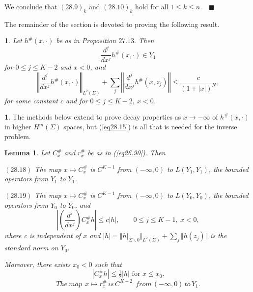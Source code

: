\documentclass{surv-l}
\theoremstyle{plain}
\newtheorem{lem}[theorem]{\sc Lemma}
\newtheorem{prop}[theorem]{\sc{Proposition}}
\theoremstyle{definition}
\newtheorem{remark}[theorem]{\sc{Remark}}
\numberwithin{equation}{chapter}
\begin{document}
We conclude that $(28.9)_{k}$ and $(28.10)_{k}$ hold for all $1\leq k\leq n.\quad \blacksquare$

The remainder of the section is devoted to proving the following result.
\setcounter{theorem}{12}
\begin{prop}\label{prop28.13} Let $h^{\#}(x, \cdot)$ be as in Proposition $27.13.$ Then
\setcounter{equation}{13}
\begin{equation}\label{eq28.14}
\frac{d^{j}}{dx^{j}}h^{\#}(x, \cdot)\in Y_{1}
\end{equation}
for $0\leq j\leq K-2$ and $x<0$, and
\begin{equation}\label{eq28.15}
\left\Vert\frac{d^{j}}{dx^{j}}h^{\#}(x, \cdot)\right\Vert_{L^{2}(\Sigma)}+\sum_{j}\left\Vert\frac{d^{j}}{d{x^{j}}}h^{\#}(x, z_{j})\right\Vert\leq\frac{c}{({1}+|x|)^{N}},
\end{equation}
for some constant $c$ and for $0\leq j\leq K-2,\ x <0$.
\end{prop}
\setcounter{theorem}{15}
\begin{remark}\label{rem28.16} The methods below extend to prove decay properties as $ x\rightarrow-\infty$ of $h^{\#}(x, \cdot)$ in higher $H^{m}(\Sigma)$ spaces, but (\ref{eq28.15}) is all that is needed for the inverse problem.
\end{remark}

\begin{lem}\label{lem28.17}
Let $C_{x}^{\#}$ and $r_{x}^{\#}$ be as in \emph{(\ref{eq26.90})}. Then

$(28.18)$ The map $ x\mapsto C_{x}^{\#}$ is $C^{K-1}$ from $(-\infty, 0)$ to $L(Y_{1}, Y_{1})$, the bounded
operators from $Y_{1}$ to $Y_{1}$.

$(28.19)$ The map $ x\mapsto C_{x}^{\#}$ is $C^{K-1}$ from $(-\infty,0)$ to $L(Y_{0}, Y_{0})$, the bounded operators from $Y_{0}$ to $Y_{0}$, and
\begin{equation*}
\left|\left(\frac{d^{j}}{dx^{j}}\right)C_{x}^{\#}h\right|\leq c|h|,\qquad 0\leq j\leq K-1,\ x<0,
\end{equation*}
where c is independent of $x$ and $|h|= \Vert h|_{\Sigma\backslash 0}\Vert_{L^{2}(\Sigma)}+\sum_{j}\Vert h(z_{j})\Vert$ is the standard norm on $Y_{0}$.

Moreover, there exists $x_{0}<0$ such that
\setcounter{equation}{19}
\begin{equation}\label{eq28.20}
|C_{x}^{\#}h|\leq\tfrac{1}{2}|h|\text{ for } x\leq x_{0}.
\end{equation}
\begin{equation}\label{eq28.21}
The\ map\ \ x\mapsto r_{x}^{\#}\, is\, C^{K-2}\ \ from\, (-\infty, 0)\, to\,Y_{1}.
\end{equation}
\end{lem}
\end{document}
